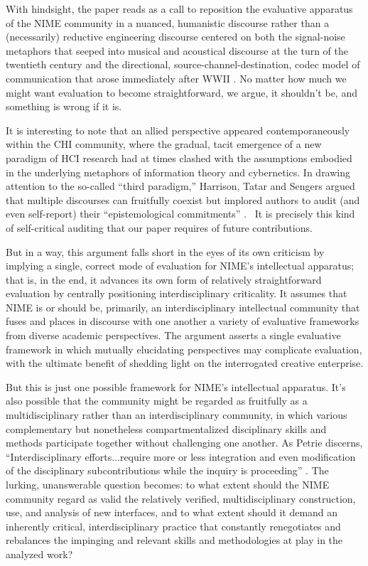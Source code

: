 With hindsight, the paper reads as a call to reposition the evaluative apparatus of the NIME community in a nuanced, humanistic discourse rather than a (necessarily) reductive engineering discourse centered on both the signal-noise metaphors that seeped into musical and acoustical discourse at the turn of the twentieth century \cite{Thompson:2002} and the directional, source-channel-destination, codec model of communication that arose immediately after WWII \cite{Kline:2015}. No matter how much we might want evaluation to become straightforward, we argue, it shouldn't be, and something is wrong if it is. 

It is interesting to note that an allied perspective appeared contemporaneously within the CHI community, where the gradual, tacit emergence of a new paradigm of HCI research had at times clashed with the assumptions embodied in the underlying metaphors of information theory and cybernetics. In drawing attention to the so-called ``third paradigm,'' Harrison, Tatar and Sengers argued that multiple discourses can fruitfully coexist but implored authors to audit (and even self-report) their ``epistemological commitments'' \cite{Harrison:2007}.  It is precisely this kind of self-critical auditing that our paper requires of future contributions.

But in a way, this argument falls short in the eyes of its own criticism by implying a single, correct mode of evaluation for NIME's intellectual apparatus; that is, in the end, it advances its own form of relatively straightforward evaluation by centrally positioning interdisciplinary criticality. It assumes that NIME is or should be, primarily, an interdisciplinary intellectual community that fuses and places in discourse with one another a variety of evaluative frameworks from diverse academic perspectives. The argument asserts a single evaluative framework in which mutually elucidating perspectives may complicate evaluation, with the ultimate benefit of shedding light on the interrogated creative enterprise. 

But this is just one possible framework for NIME's intellectual apparatus. It's also possible that the community might be regarded as fruitfully as a multidisciplinary rather than an interdisciplinary community, in which various complementary but nonetheless compartmentalized disciplinary skills and methods participate together without challenging one another. As Petrie discerns, ``Interdisciplinary efforts...require more or less integration and even modification of the disciplinary subcontributions while the inquiry is proceeding'' \cite{Petrie:1976}. The lurking, unanswerable question becomes: to what extent should the NIME community regard as valid the relatively verified, multidisciplinary construction, use, and analysis of new interfaces, and to what extent should it demand an inherently critical, interdisciplinary practice that constantly renegotiates and rebalances the impinging and relevant skills and methodologies at play in the analyzed work? 

